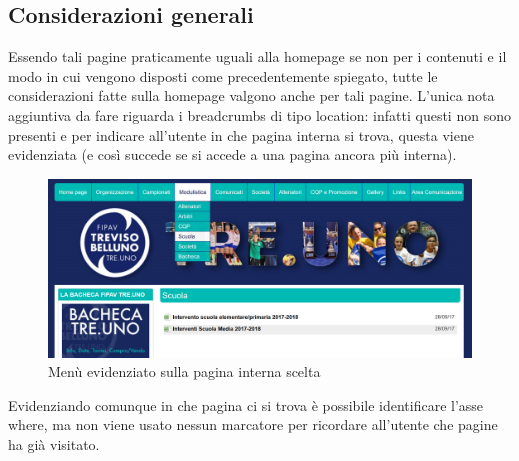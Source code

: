 	\subsection{Considerazioni generali}
	Essendo tali pagine praticamente uguali alla homepage se non per i contenuti e 
	il modo in cui vengono disposti come precedentemente spiegato, tutte le
	considerazioni fatte sulla homepage valgono anche per tali pagine. L'unica nota
	aggiuntiva da fare riguarda i breadcrumbs di tipo location: infatti questi non 
	sono presenti e per indicare all'utente in che pagina interna si trova, questa 
	viene evidenziata (e così succede se si accede a una pagina ancora più interna).
	
	\begin{figure}[H]
	\centering
	\includegraphics[scale=0.5]{Images/breadcrumb.png}
	\caption{Menù evidenziato sulla pagina interna scelta}
	\end{figure}
	
	Evidenziando comunque in che pagina ci si trova è possibile identificare 
	l'asse where, ma non viene usato nessun marcatore per ricordare all'utente che
	pagine ha già visitato.
	
	
	